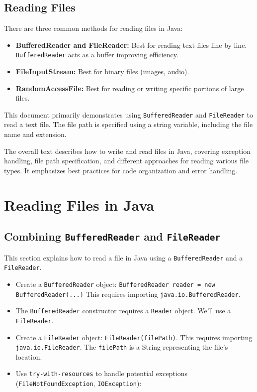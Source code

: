 \documentclass{article}
\begin{document}
\subsection{Reading Files}

There are three common methods for reading files in Java:

\begin{itemize}
    \item \textbf{BufferedReader and FileReader:} Best for reading text files line by line. \texttt{BufferedReader} acts as a buffer improving efficiency.
    \item \textbf{FileInputStream:} Best for binary files (images, audio).
    \item \textbf{RandomAccessFile:} Best for reading or writing specific portions of large files.
\end{itemize}

This document primarily demonstrates using \texttt{BufferedReader} and \texttt{FileReader} to read a text file.  The file path is specified using a string variable, including the file name and extension.


The overall text describes how to write and read files in Java, covering exception handling, file path specification, and different approaches for reading various file types.  It emphasizes best practices for code organization and error handling.


\section{Reading Files in Java}

\subsection{Combining \texttt{BufferedReader} and \texttt{FileReader}}

This section explains how to read a file in Java using a \texttt{BufferedReader} and a \texttt{FileReader}.

\begin{itemize}
    \item Create a \texttt{BufferedReader} object: \texttt{BufferedReader reader = new BufferedReader(...)}  This requires importing \texttt{java.io.BufferedReader}.
    \item The \texttt{BufferedReader} constructor requires a \texttt{Reader} object.  We'll use a \texttt{FileReader}.
    \item Create a \texttt{FileReader} object: \texttt{FileReader(filePath)}. This requires importing \texttt{java.io.FileReader}. The \texttt{filePath} is a String representing the file's location.
    \item Use \texttt{try-with-resources} to handle potential exceptions (\texttt{FileNotFoundException}, \texttt{IOException}):
\end{itemize}
\end{document}
